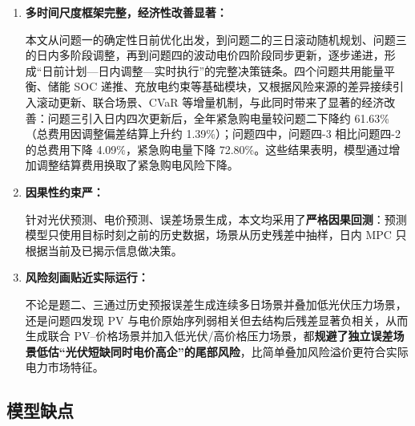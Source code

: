 \documentclass[withoutpreface,bwprint]{cumcmthesis} %
\begin{document}
\begin{enumerate}
    \item \textbf{多时间尺度框架完整，经济性改善显著：}
    
    \hspace{2em}本文从问题一的确定性日前优化出发，到问题二的三日滚动随机规划、问题三的日内多阶段调整，再到问题四的波动电价四阶段同步更新，逐步递进，形成“日前计划—日内调整—实时执行”的完整决策链条。四个问题共用能量平衡、储能 SOC 递推、充放电约束等基础模块，又根据风险来源的差异接续引入滚动更新、联合场景、CVaR 等增量机制，与此同时带来了显著的经济改善：问题三引入日内四次更新后，全年紧急购电量较问题二下降约 61.63\%（总费用因调整偏差结算上升约 1.39\%）；问题四中，问题四-3 相比问题四-2 的总费用下降 4.09\%，紧急购电量下降 72.80\%。这些结果表明，模型通过增加调整结算费用换取了紧急购电风险下降。

    \item \textbf{因果性约束严：}
    
    \hspace{2em}针对光伏预测、电价预测、误差场景生成，本文均采用了\textbf{严格因果回测}：预测模型只使用目标时刻之前的历史数据，场景从历史残差中抽样，日内 MPC 只根据当前及已揭示信息做决策。

    \item \textbf{风险刻画贴近实际运行：}
    
    不论是题二、三通过历史预报误差生成连续多日场景并叠加低光伏压力场景，还是问题四发现 PV 与电价原始序列弱相关但去结构后残差显著负相关，从而生成联合 PV--价格场景并加入低光伏/高价格压力场景，都\textbf{规避了独立误差场景低估“光伏短缺同时电价高企”的尾部风险}，比简单叠加风险溢价更符合实际电力市场特征。
\end{enumerate}


\subsection{模型缺点}
\end{document}
